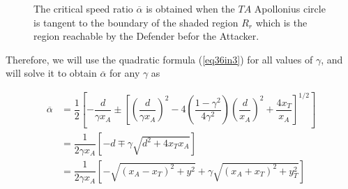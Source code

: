 \begin{figure}
\centering
{}
\quad
{}
\quad
{}
\caption{The critical speed ratio $\overline{\alpha}$ is obtained when the $TA$ Apollonius circle is tangent to the boundary of the shaded region $R_r$ which is the region reachable by the Defender befor the Attacker.}
\label{CSR}
\end{figure}


Therefore, we will use the quadratic formula (\ref{eq36in3}) for all values of $\gamma$, and will solve it to obtain $\overline{\alpha}$ for any $\gamma$ as 

\begin{equation}
\begin{split}
\overline{\alpha}&=\dfrac{1}{2}[-\dfrac{d}{\gamma x_{A}}
\pm[(\dfrac{d}{\gamma x_{A}})^{2}-4(\dfrac{1-\gamma^{2}}{4\gamma^{2}})(\dfrac{d}{x_{A}})^{2}+\dfrac{4x_{T}}{x_{A}}]^{1/2} ]\\
&= \dfrac{1}{2\gamma x_{A}} [-d \mp \gamma \sqrt{d^{2}+4 x_{T} x_{A}}]\\
&= \dfrac{1}{2 \gamma x_{A}} [- \sqrt{(x_{A}-x_{T})^{2} + y^{2}}+ \gamma \sqrt{(x_{A}+ x_{T})^{2}+y_{T}^{2}}]
\end{split}
\label{cr_alpha_3}
\end{equation}







